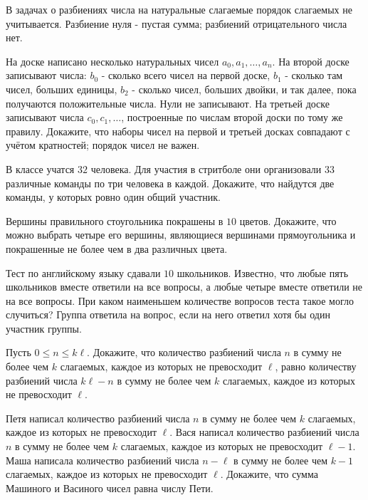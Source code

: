 

\ifPDFTeX
  \renewcommand{\rmdefault}{cmr}
\fi

\def\SheetNo{6}
\setlength{\emergencystretch}{2em}



\noindent В задачах о разбиениях числа на натуральные слагаемые порядок слагаемых не учитывается. Разбиение нуля - пустая сумма; разбиений отрицательного числа нет.

\begin{problems}

\item На доске написано несколько натуральных чисел $a_0,a_1,\ldots,a_n$. На второй доске записывают числа: $b_0$ - сколько всего чисел на первой доске, $b_1$ - сколько там чисел, больших единицы, $b_2$ - сколько чисел, больших двойки, и так далее, пока получаются положительные числа. Нули не записывают. На третьей доске записывают числа $c_0,c_1,\ldots$, построенные по числам второй доски по тому же правилу. Докажите, что наборы чисел на первой и третьей досках совпадают с учётом кратностей; порядок чисел не важен.

\item В классе учатся $32$ человека. Для участия в стритболе они организовали $33$ различные команды по три человека в каждой. Докажите, что найдутся две команды, у которых ровно один общий участник.

\item Вершины правильного стоугольника покрашены в $10$ цветов. Докажите, что можно выбрать четыре его вершины, являющиеся вершинами прямоугольника и покрашенные не более чем в два различных цвета.

\item Тест по английскому языку сдавали $10$ школьников. Известно, что любые пять школьников вместе ответили на все вопросы, а любые четыре вместе ответили не на все вопросы. При каком наименьшем количестве вопросов теста такое могло случиться? Группа ответила на вопрос, если на него ответил хотя бы один участник группы.

\item Пусть $0\le n\le k\ell$. Докажите, что количество разбиений числа $n$ в сумму не более чем $k$ слагаемых, каждое из которых не превосходит $\ell$, равно количеству разбиений числа $k\ell-n$ в сумму не более чем $k$ слагаемых, каждое из которых не превосходит $\ell$.

\item Петя написал количество разбиений числа $n$ в сумму не более чем $k$ слагаемых, каждое из которых не превосходит $\ell$. Вася написал количество разбиений числа $n$ в сумму не более чем $k$ слагаемых, каждое из которых не превосходит $\ell-1$. Маша написала количество разбиений числа $n-\ell$ в сумму не более чем $k-1$ слагаемых, каждое из которых не превосходит $\ell$. Докажите, что сумма Машиного и Васиного чисел равна числу Пети.


\end{problems}
